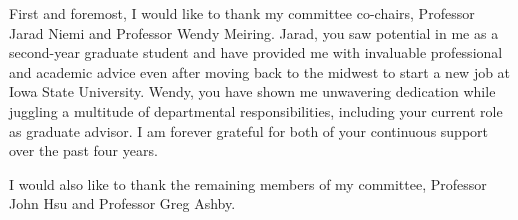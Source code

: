   \approvalpage
  \copyrightpage

  \begin{acknowledgements}

  First and foremost, I would like to thank my committee co-chairs, Professor Jarad Niemi and Professor Wendy Meiring. Jarad, you saw potential in me as a second-year graduate student and have provided me with invaluable professional and academic advice even after moving back to the midwest to start a new job at Iowa State University. Wendy, you have shown me unwavering dedication while juggling a multitude of departmental responsibilities, including your current role as graduate advisor. I am forever grateful for both of your continuous support over the past four years.
  
  I would also like to thank the remaining members of my committee, Professor John Hsu and Professor Greg Ashby.

  \end{acknowledgements}
\ssp

